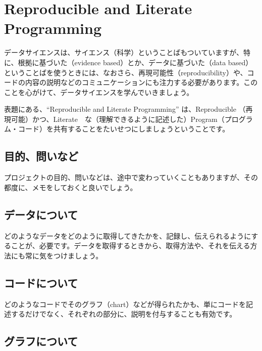 \documentclass[
  xelatex, ja=standard]{bxjsbook}
\theoremstyle{definition}
\theoremstyle{definition}
\theoremstyle{definition}
\theoremstyle{definition}
\theoremstyle{remark}
\begin{document}
\hypertarget{reproducible-and-literate-programming}{%
\section{Reproducible and Literate Programming}\label{reproducible-and-literate-programming}}

データサイエンスは、サイエンス（科学）ということばもついていますが、特に、根拠に基づいた（evidence based）とか、データに基づいた（data based）ということばを使うときには、なおさら、再現可能性（reproducibility）や、コードの内容の説明などのコミュニケーションにも注力する必要があります。このことを心がけて、データサイエンスを学んでいきましょう。

表題にある、``Reproducible and Literate Programming'' は、Reproducible （再現可能）かつ、Literate　な（理解できるように記述した）Program（プログラム・コード）を共有することをたいせつにしましょうということです。

\hypertarget{ux76eeux7684ux554fux3044ux306aux3069}{%
\subsection{目的、問いなど}\label{ux76eeux7684ux554fux3044ux306aux3069}}

プロジェクトの目的、問いなどは、途中で変わっていくこともありますが、その都度に、メモをしておくと良いでしょう。

\hypertarget{ux30c7ux30fcux30bfux306bux3064ux3044ux3066}{%
\subsection{データについて}\label{ux30c7ux30fcux30bfux306bux3064ux3044ux3066}}

どのようなデータをどのように取得してきたかを、記録し、伝えられるようにすることが、必要です。データを取得するときから、取得方法や、それを伝える方法にも常に気をつけましょう。

\hypertarget{ux30b3ux30fcux30c9ux306bux3064ux3044ux3066}{%
\subsection{コードについて}\label{ux30b3ux30fcux30c9ux306bux3064ux3044ux3066}}

どのようなコードでそのグラフ（chart）などが得られたかも、単にコードを記述するだけでなく、それぞれの部分に、説明を付与することも有効です。

\hypertarget{ux30b0ux30e9ux30d5ux306bux3064ux3044ux3066}{%
\subsection{グラフについて}\label{ux30b0ux30e9ux30d5ux306bux3064ux3044ux3066}}
\end{document}
